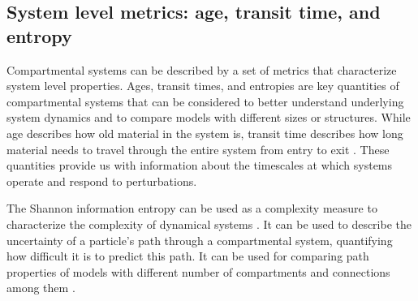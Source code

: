 \subsection{System level metrics: age, transit time, and entropy}
Compartmental systems can be described by a set of metrics that characterize system level properties. 
Ages, transit times, and entropies are key quantities of compartmental systems that can be considered to better understand underlying system dynamics and to compare models with different sizes or structures.
While age describes how old material in the system is, transit time describes how long material needs to travel through the entire system from entry to exit \citep{bolin1973Tellus, Sierra2017GCB}.
These quantities provide us with information about the timescales at which systems operate and respond to perturbations.

The Shannon information entropy can be used as a complexity measure  to characterize the complexity of dynamical systems \citep{Ebeling1998}.
It can be used to describe the uncertainty of a particle's path through a compartmental system, quantifying how difficult it is to predict this path. It can be used for comparing path properties of models with different number of compartments and connections among them \citep{Metzler2020}.

